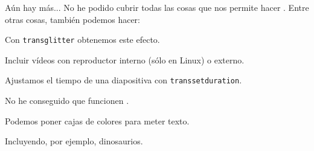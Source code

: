 \begin{frame}{Aún hay más...}
  No he podido cubrir todas las cosas que nos permite hacer \beamer \frownie{}.
  Entre otras cosas, también podemos hacer:
  \espacio
  \begin{description}[<+->]
    \item[Transiciones] Con \texttt{transglitter} obtenemos este efecto.
    \item[Multimedia] Incluir vídeos con reproductor interno (sólo en Linux) o externo.
    \item[Temporización] Ajustamos el tiempo de una diapositiva con \texttt{transsetduration}.
    \item[Animaciones] No he conseguido que funcionen \frownie{}.
    \item[Cajas]
    \begin{beamercolorbox}[shadow=true]
      Podemos poner cajas de colores para meter texto.
    \end{beamercolorbox}
    \item[Overlays de imágenes] Incluyendo, por ejemplo, dinosaurios.
  \end{description}

\end{frame}
